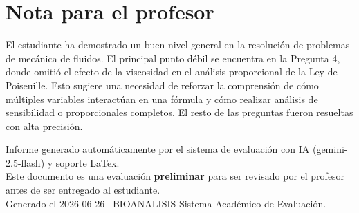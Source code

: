 \documentclass[11pt,a4paper]{article}
\begin{document}
\section*{Nota para el profesor}
\begin{tcolorbox}[
  enhanced, breakable,
  colback=yellow!8, colframe=yellow!60!black,
  fonttitle=\bfseries, coltitle=black,
  title={Observaciones para revisión manual},
  top=4pt, bottom=4pt, left=8pt, right=8pt,
]
El estudiante ha demostrado un buen nivel general en la resolución de problemas de mecánica de fluidos. El principal punto débil se encuentra en la Pregunta 4, donde omitió el efecto de la viscosidad en el análisis proporcional de la Ley de Poiseuille. Esto sugiere una necesidad de reforzar la comprensión de cómo múltiples variables interactúan en una fórmula y cómo realizar análisis de sensibilidad o proporcionales completos. El resto de las preguntas fueron resueltas con alta precisión.
\end{tcolorbox}

\vspace{12pt}
\begin{center}
  \footnotesize\color{gray}
  Informe generado automáticamente por el sistema de evaluación con IA (gemini-2.5-flash) y soporte LaTex. \\
  Este documento es una evaluación \textbf{preliminar} para ser revisado por el profesor antes de ser entregado al 
  estudiante. \\
  Generado el 2026-06-26 \textbullet\ BIOANALISIS Sistema Académico de Evaluación.
  \end{center}
\end{document}
